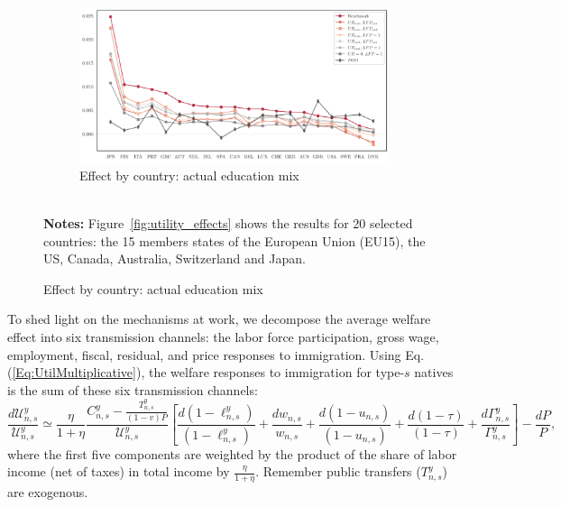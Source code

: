 \documentclass[a4paper,12pt]{article}
\begin{document}
\begin{landscape}
\begin{center}
\begin{figure}[htb!]
\begin{subfigure}{.45\linewidth}
\end{subfigure}%
\hfill
\begin{subfigure}{.45\linewidth}
  \centering
  \caption{Effect by country: actual education mix} \label{fig:utility_effects_d}
  \includegraphics[width=\linewidth]{graphs/Utility_LS+HS.pdf}
\end{subfigure}
\\[0.5cm]
{\footnotesize \textbf{Notes:} Figure~\ref{fig:utility_effects} shows the results for 20 selected countries: the 15 members states of the European Union (EU15), the US, Canada,
Australia, Switzerland and Japan.}
\end{figure}
\end{center}
\vspace*{\fill}
\end{landscape}
\restoregeometry

To shed light on the mechanisms at work, we decompose the average welfare effect into six transmission channels: the labor force participation, gross wage, employment, fiscal, residual, and price responses to immigration. Using Eq. (\ref{Eq:UtilMultiplicative}), the welfare responses to immigration for type-$s$ natives is the sum of these six transmission channels:%
\begin{equation}
\frac{d\mathcal{U}_{n,s}^{y}}{\mathcal{U}_{n,s}^{y}}\simeq \frac{\eta}{1+\eta} \frac{C_{n,s}^{y}-\frac{T_{n,s}^{y}}{(1-v)P}}{\mathcal{U}_{n,s}^{y}}\left[ \frac{d(1-\ell _{n,s}^{y})}{(1-\ell _{n,s}^{y})}+\frac{dw_{n,s}}{w_{n,s}}+\frac{d(1-u_{n,s})}{(1-u_{n,s})}+\frac{d(1-\tau )}{(1-\tau )}+\frac{d\Gamma _{n,s}^{y}}{\Gamma _{n,s}^{y}}\right] -\frac{dP}{P},
\label{Eq:DecompPrivateCons}
\end{equation}
where the first five components are weighted by the product of the share of labor income (net of taxes) in total income by $\frac{\eta}{1+\eta}$. Remember public transfers ($T_{n,s}^{y}$) are exogenous.
\end{document}
